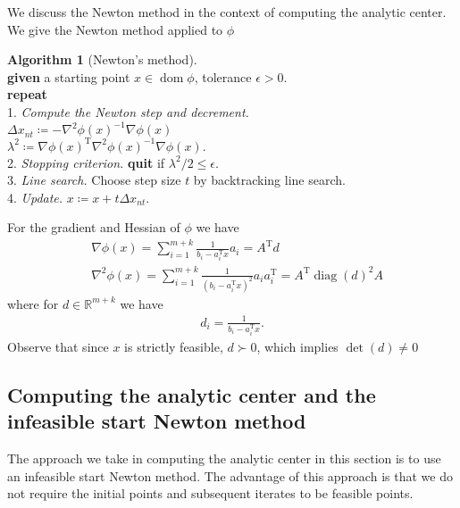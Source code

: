\documentclass[11pt]{amsart}
\theoremstyle{definition}
\newtheorem{algorithm}{Algorithm}[section]
\theoremstyle{remark}
\newcommand{\ind}{\hspace*{0.5cm}}
\newcommand{\transpose}{\text{T}}
\DeclareMathOperator{\domain}{dom}
\DeclareMathOperator{\diag}{diag}
\begin{document}
        We discuss the Newton method in the context of computing the analytic center. We give the Newton method applied to $\phi$
        \begin{algorithm}[Newton's method]
        \label{a:basic_conceptual_cp_alg}\mbox{}\\
            \ind \textbf{given} a starting point $x \in \domain \phi$, tolerance $\epsilon > 0.$ \\
            \ind \textbf{repeat} \\
            \ind\ind 1. \emph{Compute the Newton step and decrement.} \\
            \ind\ind\ind $\Delta x_{nt} \coloneqq -\nabla^2 \phi(x)^{-1} \nabla \phi(x)$ \\
            \ind\ind\ind $\lambda^2 \coloneqq \nabla \phi(x)^\transpose \nabla^2 \phi(x)^{-1} \nabla \phi(x).$ \\
            \ind\ind 2. \emph{Stopping criterion.} \textbf{quit} if $\lambda^2/2 \leq \epsilon.$\\
            \ind\ind 3. \emph{Line search.} Choose step size $t$ by backtracking line search. \\
            \ind\ind 4. \emph{Update.} $x \coloneqq x + t\Delta x_{nt}.$ \\
        \end{algorithm} 
        For the gradient and Hessian of $\phi$ we have
        \begin{align}
            &\nabla \phi(x) = \sum_{i=1}^{m+k} \frac{1}{b_i - a_i^\transpose x}a_i = A^\transpose d \\
            &\nabla^2 \phi(x) = \sum_{i=1}^{m+k} \frac{1}{(b_i - a_i^\transpose x)^2}a_i a_i^\transpose = A^\transpose \diag(d)^2 A
        \end{align}
        where for $d \in \mathbb{R}^{m+k}$ we have
        \begin{align*}
            d_i = \frac{1}{b_i - a_i^\transpose x}.
        \end{align*}
        Observe that since $x$ is strictly feasible, $d \succ 0$, which implies $\det(d) \neq 0$ 

    \subsection{Computing the analytic center and the infeasible start Newton method}
        The approach we take in computing the analytic center in this section is to use an infeasible start Newton method. The advantage of this approach is that we do not require the initial points and subsequent iterates to be feasible points. 
\end{document}
